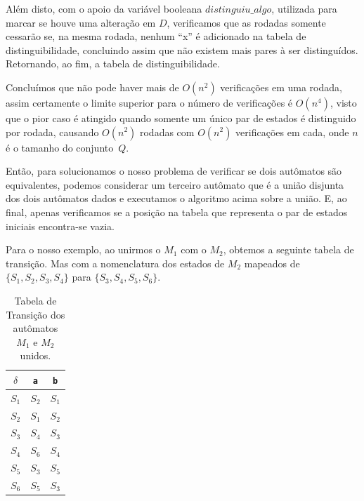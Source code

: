 \documentclass[
	12pt,				%
	openany,
	oneside,
	a4paper,			%
	english,			%
	brazil				%
	]{abntex2}
\begin{document}
  Além disto, com o apoio da variável booleana $distinguiu{\_}algo$, utilizada para marcar se houve uma alteração em $D$, verificamos que as rodadas somente cessarão se, na mesma rodada, nenhum ``x'' é adicionado na tabela de distinguibilidade, concluindo assim que não existem mais pares à ser distinguídos. Retornando, ao fim, a tabela de distinguibilidade.

  Concluímos que não pode haver mais de $O(n^2)$ verificações em uma rodada, assim certamente o limite superior para o número de verificações é $O(n^4)$, visto que o pior caso é atingido quando somente um único par de estados é distinguido por rodada, causando $O(n^2)$ rodadas com $O(n^2)$ verificações em cada, onde $n$ é o tamanho do conjunto~$Q$.

  Então, para solucionamos o nosso problema de verificar se dois autômatos são equivalentes, podemos considerar um terceiro autômato que é a união disjunta dos dois autômatos dados e executamos o algoritmo acima sobre a união. E, ao final, apenas verificamos se a posição na tabela que representa o par de estados iniciais encontra-se vazia.


  Para o nosso exemplo, ao unirmos o $M_1$ com o $M_2$, obtemos a seguinte tabela de transição. Mas com a nomenclatura dos estados de $M_2$ mapeados de $\{S_1, S_2, S_3, S_4\}$ para $\{S_3, S_4, S_5, S_6\}$.

  \begin{table}[H]
    \centering
    \begin{tabular}[H]{c|c c}
      $\delta$ & \textbf{\texttt{a}} & \textbf{\texttt{b}} \\
      \hline
      $S_1$    & $S_2$               & $S_1$               \\
      $S_2$    & $S_1$               & $S_2$               \\
      $S_3$    & $S_4$               & $S_3$               \\
      $S_4$    & $S_6$               & $S_4$               \\
      $S_5$    & $S_3$               & $S_5$               \\
      $S_6$    & $S_5$               & $S_3$               \\
    \end{tabular}
    \caption{Tabela de Transição dos autômatos $M_1$ e $M_2$ unidos.}
    \vspace{-0.5cm}
  \end{table}
\end{document}
